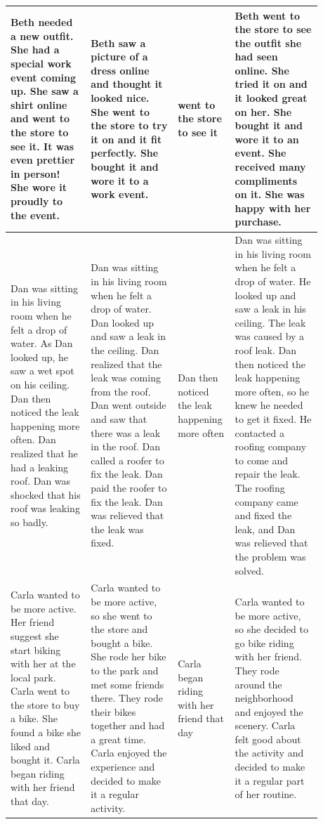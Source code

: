 \begin{table}[htp!]
\begin{tabular}{|p{0.24\linewidth}|p{0.26\linewidth}|p{0.12\linewidth}|p{0.26\linewidth}|}
Beth needed a new outfit. She had a special work event coming up. She saw a shirt online and went to the store to see it. It was even prettier in person! She wore it proudly to the event.
& Beth saw a picture of a dress online and thought it looked nice. She went to the store to try it on and it fit perfectly. She bought it and wore it to a work event.
& went to the store to see it
& Beth went to the store to see the outfit she had seen online. She tried it on and it looked great on her. She bought it and wore it to an event. She received many compliments on it. She was happy with her purchase. \\ \hline

Dan was sitting in his living room when he felt a drop of water. As Dan looked up, he saw a wet spot on his ceiling. Dan then noticed the leak happening more often. Dan realized that he had a leaking roof. Dan was shocked that his roof was leaking so badly.
& Dan was sitting in his living room when he felt a drop of water. Dan looked up and saw a leak in the ceiling. Dan realized that the leak was coming from the roof. Dan went outside and saw that there was a leak in the roof. Dan called a roofer to fix the leak. Dan paid the roofer to fix the leak. Dan was relieved that the leak was fixed.
& Dan then noticed the leak happening more often
& Dan was sitting in his living room when he felt a drop of water. He looked up and saw a leak in his ceiling. The leak was caused by a roof leak. Dan then noticed the leak happening more often, so he knew he needed to get it fixed. He contacted a roofing company to come and repair the leak. The roofing company came and fixed the leak, and Dan was relieved that the problem was solved. \\ \hline

Carla wanted to be more active. Her friend suggest she start biking with her at the local park. Carla went to the store to buy a bike. She found a bike she liked and bought it. Carla began riding with her friend that day.
& Carla wanted to be more active, so she went to the store and bought a bike. She rode her bike to the park and met some friends there. They rode their bikes together and had a great time. Carla enjoyed the experience and decided to make it a regular activity.
& Carla began riding with her friend that day
& Carla wanted to be more active, so she decided to go bike riding with her friend. They rode around the neighborhood and enjoyed the scenery. Carla felt good about the activity and decided to make it a regular part of her routine. \\ \hline


\end{tabular}
\end{table}
